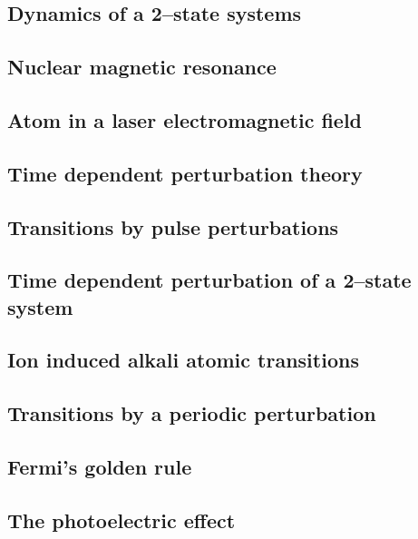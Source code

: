 \documentclass{article}
\begin{document}
\subsection{Dynamics of a 2–state systems}
\subsection{Nuclear magnetic resonance}
\subsection{Atom in a laser electromagnetic field}
\subsection{Time dependent perturbation theory}
\subsection{Transitions by pulse perturbations}
\subsection{Time dependent perturbation of a 2–state system}
\subsection{Ion induced alkali atomic transitions}
\subsection{Transitions by a periodic perturbation}
\subsection{Fermi’s golden rule}
\subsection{The photoelectric effect}
\end{document}
